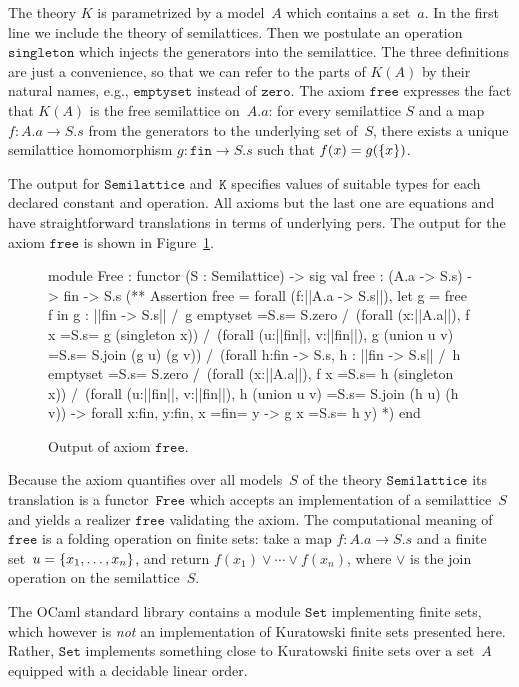 %
The theory $K$ is parametrized by a model~$A$ which contains a
set~$a$. In the first line we include the theory of semilattices. Then
we postulate an operation $\mathtt{singleton}$ which injects the
generators into the semilattice. The three definitions are just a
convenience, so that we can refer to the parts of $K(A)$ by their
natural names, e.g., $\mathtt{emptyset}$ instead of $\mathtt{zero}$.
The axiom $\mathtt{free}$ expresses the fact that $K(A)$ is the free
semilattice on~$A.a$: for every semilattice $S$ and a map $f : A.a \to
S.s$ from the generators to the underlying set of~$S$, there exists a
unique semilattice homomorphism $g : \mathtt{fin} \to S.s$ such that
$f(x) = g(\{x\})$.

The output for $\mathtt{Semilattice}$ and~$\mathtt{K}$ specifies
values of suitable types for each declared constant and operation. All
axioms but the last one are equations and have straightforward
translations in terms of underlying pers. The output for the axiom
$\mathtt{free}$ is shown in Figure~\ref{fig:free}.
%
\begin{figure}
  \centering
\begin{source}
module Free : functor (S : Semilattice) ->
sig
val free : (A.a -> S.s) -> fin -> S.s
(**  Assertion free = 
forall (f:||A.a -> S.s||), 
  let g = free f in g : ||fin -> S.s|| /\ 
  g emptyset =S.s= S.zero /\ 
  (forall (x:||A.a||),  f x =S.s= g (singleton x)) /\ 
  (forall (u:||fin||, v:||fin||), g (union u v) =S.s= S.join (g u) (g v)) /\ 
  (forall h:fin -> S.s,  h : ||fin -> S.s|| /\ 
     h emptyset =S.s= S.zero /\ 
     (forall (x:||A.a||), f x =S.s= h (singleton x)) /\ 
     (forall (u:||fin||, v:||fin||), 
        h (union u v) =S.s= S.join (h u) (h v)) ->
     forall x:fin, y:fin,  x =fin= y -> g x =S.s= h y)
*)
end
\end{source}
  \caption{Output of axiom $\texttt{free}$.}
  \label{fig:free}
\end{figure}
%
Because the axiom quantifies over all models~$S$ of the theory
$\mathtt{Semilattice}$ its translation is a functor~$\mathtt{Free}$
which accepts an implementation of a semilattice~$S$ and yields a
realizer $\mathtt{free}$ validating the axiom. The computational
meaning of $\mathtt{free}$ is a folding operation on finite sets: take
a map $f : A.a \to S.s$ and a finite set~$u = \{x_1, \ldots, x_n\}$,
and return $f(x_1) \vee \cdots \vee f(x_n)$, where $\vee$ is the join
operation on the semilattice~$S$.

The OCaml standard library contains a module $\mathtt{Set}$
implementing finite sets, which however is \emph{not} an
implementation of Kuratowski finite sets presented here. Rather,
$\mathtt{Set}$ implements something close to Kuratowski finite sets
over a set~$A$ equipped with a decidable linear order.



